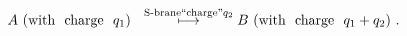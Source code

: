 \begin{equation}
A \ \mbox{(with \ charge \ $q_1$)} \ \ \stackrel{
\mbox{\scriptsize S-brane``charge''}q_2}{\longmapsto}
B \ \mbox{(with \ charge \ $q_1+q_2$)}  \ .
\end{equation}

